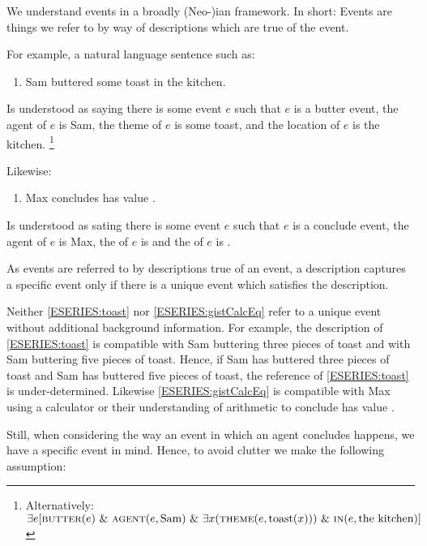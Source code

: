 \begin{note}
  We understand events in a broadly (Neo-)\citeauthor{Davidson:1967aa}ian framework.
  In short:
  Events are things we refer to by way of descriptions which are true of the event.

  For example, a natural language sentence such as:
  \begin{enumerate}[label=\arabic*., ref=(\arabic*), series=ESERIES]
  \item
    \label{ESERIES:toast}
    Sam buttered some toast in the kitchen.
  \end{enumerate}
  Is understood as saying there is some event \(e\) such that \(e\) is a butter event, the agent of \(e\) is Sam, the theme of \(e\) is some toast, and the location of \(e\) is the kitchen.%
  \footnote{
    Alternatively:
    \(\exists e [\textsc{butter}(e)\text{ \& }\textsc{agent}(e, \text{Sam})\text{ \& }\exists x(\textsc{theme}(e, \text{toast}(x)))\text{ \& }\textsc{in}(e, \text{the kitchen})]\)
  }

  Likewise:
  \begin{enumerate}[label=\arabic*., ref=(\arabic*), resume*=ESERIES]
  \item
    \label{ESERIES:gistCalcEq}
    Max concludes \gistCalcEq{} has value .
  \end{enumerate}
  Is understood as sating there is some event \(e\) such that \(e\) is a conclude event, the agent of \(e\) is Max, the  of \(e\) is \gistCalcEq{} and the \val{} of \(e\) is .

  As events are referred to by descriptions true of an event, a description captures a specific event only if there is a unique event which satisfies the description.

  Neither \ref{ESERIES:toast} nor \ref{ESERIES:gistCalcEq} refer to a unique event without additional background information.
  For example, the description of \ref{ESERIES:toast} is compatible with Sam buttering three pieces of toast and with Sam buttering five pieces of toast.
  Hence, if Sam has buttered three pieces of toast and Sam has buttered five pieces of toast, the reference of \ref{ESERIES:toast} is under-determined.
  Likewise \ref{ESERIES:gistCalcEq} is compatible with Max using a calculator or their understanding of arithmetic to conclude \gistCalcEq{} has value .

  Still, when considering the way an event in which an agent concludes happens, we have a specific event in mind.
  Hence, to avoid clutter we make the following assumption:


\end{note}
